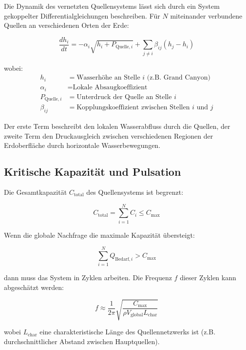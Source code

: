 ﻿\documentclass[12pt,a4paper]{report}
\begin{document}
Die Dynamik des vernetzten Quellensystems lässt sich durch ein System gekoppelter Differentialgleichungen beschreiben. Für $N$ miteinander verbundene Quellen an verschiedenen Orten der Erde:

\begin{equation}
	\frac{dh_i}{dt} = -\alpha_i \sqrt{h_i + P_{\text{Quelle},i}} + \sum_{j \neq i} \beta_{ij}(h_j - h_i)
\end{equation}

wobei:
\begin{align}
	h_i &= \text{Wasserhöhe an Stelle } i \text{ (z.B. Grand Canyon)} \\
	\alpha_i &= \text{Lokale Absaugkoeffizient} \\
	P_{\text{Quelle},i} &= \text{Unterdruck der Quelle an Stelle } i \\
	\beta_{ij} &= \text{Kopplungskoeffizient zwischen Stellen } i \text{ und } j
\end{align}

Der erste Term beschreibt den lokalen Wasserabfluss durch die Quellen, der zweite Term den Druckausgleich zwischen verschiedenen Regionen der Erdoberfläche durch horizontale Wasserbewegungen.

\subsection{Kritische Kapazität und Pulsation}

Die Gesamtkapazität $C_{\text{total}}$ des Quellensystems ist begrenzt:

\begin{equation}
	C_{\text{total}} = \sum_{i=1}^{N} C_i \leq C_{\text{max}}
\end{equation}

Wenn die globale Nachfrage die maximale Kapazität übersteigt:

\begin{equation}
	\sum_{i=1}^{N} Q_{\text{Bedarf},i} > C_{\text{max}}
\end{equation}

dann muss das System in Zyklen arbeiten. Die Frequenz $f$ dieser Zyklen kann abgeschätzt werden:

\begin{equation}
	f \approx \frac{1}{2\pi} \sqrt{\frac{C_{\text{max}}}{\rho V_{\text{global}} L_{\text{char}}}}
\end{equation}

wobei $L_{\text{char}}$ eine charakteristische Länge des Quellennetzwerks ist (z.B. durchschnittlicher Abstand zwischen Hauptquellen).
\end{document}
